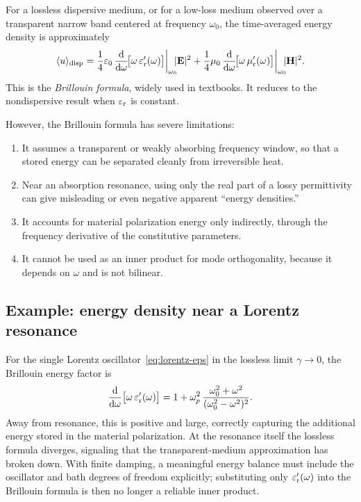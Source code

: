 For a lossless dispersive medium, or for a low-loss medium observed over a
transparent narrow band centered at frequency $\omega_0$, the
time-averaged energy density is approximately
\begin{equation}
 \langle u\rangle_{\mathrm{disp}}
 = \frac{1}{4}\epsvac\,
 \dv{}{\omega}\!\bigl[\omega\,\epsr'(\omega)\bigr]
 \bigg|_{\omega_0}\!\!|\EE|^2
 + \frac{1}{4}\muvac\,
 \dv{}{\omega}\!\bigl[\omega\,\mur'(\omega)\bigr]
 \bigg|_{\omega_0}\!\!|\HH|^2.
 \label{eq:brillouin-full}
\end{equation}
This is the \emph{Brillouin formula}, widely used in textbooks. It
reduces to the nondispersive result when $\varepsilon_{\mathrm{r}}$ is constant.

However, the Brillouin formula has severe limitations:
\begin{enumerate}
 \item It assumes a transparent or weakly absorbing frequency window, so
 that a stored energy can be separated cleanly from irreversible heat.
 \item Near an absorption resonance, using only the real part of a
 lossy permittivity can give misleading or even negative apparent
 ``energy densities.''
 \item It accounts for material polarization energy only indirectly,
 through the frequency derivative of the constitutive parameters.
 \item It cannot be used as an inner product for mode
 orthogonality, because it depends on $\omega$ and is not bilinear.
\end{enumerate}

\subsection{Example: energy density near a Lorentz resonance}
\label{ssec:brillouin-lorentz}

For the single Lorentz oscillator~\eqref{eq:lorentz-eps} in the lossless
limit $\gamma\to 0$, the Brillouin energy factor is
\begin{equation}
 \frac{\mathop{}\!\mathrm{d} }{\mathop{}\!\mathrm{d} \omega}\bigl[\omega\,\varepsilon_{\mathrm{r}}'(\omega)\bigr]
 = 1 + \omega_p^2\,
 \frac{\omega_0^2 + \omega^2}{(\omega_0^2-\omega^2)^2}.
 \label{eq:brillouin-lorentz}
\end{equation}
Away from resonance, this is positive and large, correctly capturing the
additional energy stored in the material polarization. At the resonance
itself the lossless formula
diverges, signaling that the transparent-medium approximation has broken
down. With finite damping, a meaningful energy balance must include the
oscillator and bath degrees of freedom explicitly; substituting only
$\varepsilon_{\mathrm{r}}'(\omega)$ into the Brillouin formula is then no longer a reliable
inner product.

